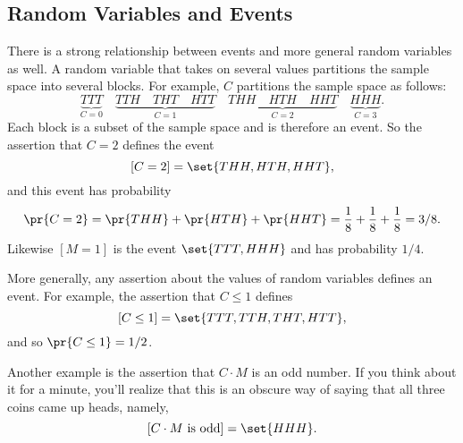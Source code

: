 \subsection{Random Variables and Events}

There is a strong relationship between events and more general random
variables as well.  A random variable that takes on several values
partitions the sample space into several blocks.  For example, $C$
partitions the sample space as follows:
\[
\underbrace{TTT}_{\text{$C = 0$}} \quad
\underbrace{TTH \quad THT \quad HTT}_{\text{$C = 1$}} \quad
\underbrace{THH \quad HTH \quad HHT}_{\text{$C = 2$}} \quad
\underbrace{HHH}_{\text{$C = 3$}}.
\]
Each block is a subset of the sample space and is therefore an event.
So the assertion that $C = 2$ defines the event
\[
[C = 2] = \set{THH, HTH, HHT},
\]
and this event has probability
\[
\pr{C = 2} = \pr{THH} + \pr{HTH} +\pr{HHT} = \frac{1}{8} + \frac{1}{8} +\frac{1}{8} =3/8.
\]
Likewise $[M = 1]$ is the event $\set{TTT, HHH}$ and has probability
$1/4$.

\iffalse
As another example:
\[
\pr{M = 1} =  \pr{TTT} + \pr{HHH} =  \frac{1}{8} + \frac{1}{8} =  \frac{1}{4}\,.
\]
\fi

More generally, any assertion about the values of random variables
defines an event.  For example, the assertion that $C \leq 1$ defines
\[
[C \leq 1] = \set{TTT, TTH, THT, HTT},
\]
and so $\pr{C \leq 1}= 1/2$.

Another example is the assertion that $C \cdot M$ is an odd number.
If you think about it for a minute, you'll realize that this is an
obscure way of saying that all three coins came up heads, namely,
\[
[C \cdot M \text{ is odd}] = \set{HHH}.
\]

\iffalse

Naturally enough, we can talk about the probability of events defined
by properties of random variables.  For example,
\[
\pr{C = 2}  =  \pr{THH} + \pr{HTH} + \pr{HHT}  =  \frac{1}{8} +
\frac{1}{8} + \frac{1}{8} =  \frac{3}{8}.
\]

\begin{eqnarray*}
\pr{C = 2}
        & = &   \pr{THH} + \pr{HTH} + \pr{HHT} \\
        & = &   \frac{1}{8} + \frac{1}{8} + \frac{1}{8} =  \frac{3}{8}\,.
\end{eqnarray*}

As another example:
\[
\pr{M = 1} =  \pr{TTT} + \pr{HHH} =  \frac{1}{8} + \frac{1}{8} =  \frac{1}{4}\,.
\]


\begin{eqnarray*}
\pr{M = 1}
        & = &   \pr{TTT} + \pr{HHH}\\
        & = &   \frac{1}{8} + \frac{1}{8} =  \frac{1}{4}.
\end{eqnarray*}
\fi

